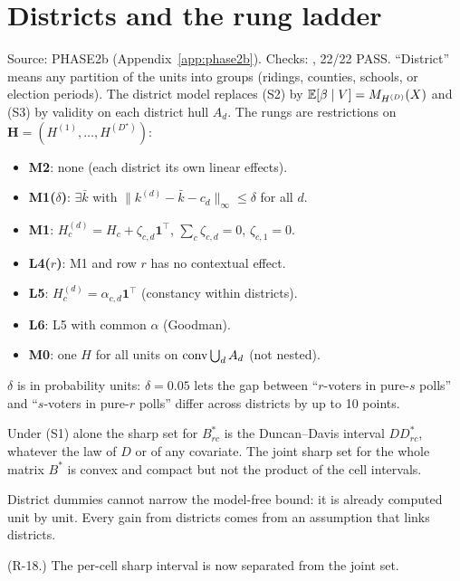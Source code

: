 \section{Districts and the rung ladder}\label{sec:districts}

Source: PHASE2b (Appendix~\ref{app:phase2b}). Checks:
, 22/22 PASS. ``District'' means any partition of the
units into groups (ridings, counties, schools, or election periods). The district
model replaces (S2) by $\mathbb E[\beta\mid V]=M_{H^{(D)}}(X)$ and (S3) by validity on
each district hull $A_d$. The rungs are restrictions on
$\mathbf H=(H^{(1)},\dots,H^{(D^\star)})$:
\begin{itemize}[nosep]
\item \textbf{M2}: none (each district its own linear effects).
\item \textbf{M1($\delta$)}: $\exists\bar k$ with $\|k^{(d)}-\bar k-c_d\|_\infty\le\delta$ for all $d$.
\item \textbf{M1}: $H^{(d)}_c=H_c+\zeta_{c,d}\mathbf 1^\top$, $\sum_c\zeta_{c,d}=0$, $\zeta_{c,1}=0$.
\item \textbf{L4($r$)}: M1 and row $r$ has no contextual effect.
\item \textbf{L5}: $H^{(d)}_c=\alpha_{c,d}\mathbf 1^\top$ (constancy within districts).
\item \textbf{L6}: L5 with common $\alpha$ (Goodman).
\item \textbf{M0}: one $H$ for all units on $\operatorname{conv}\bigcup_dA_d$ (not nested).
\end{itemize}
$\delta$ is in probability units: $\delta=0.05$ lets the gap between ``$r$-voters
in pure-$s$ polls'' and ``$s$-voters in pure-$r$ polls'' differ across districts
by up to 10 points.

\begin{result}\label{res:d0}
 Under (S1) alone the sharp set for $B^*_{rc}$ is the
Duncan--Davis interval $DD^*_{rc}$, whatever the law of $D$ or of any
covariate. The joint sharp set for the whole matrix $B^*$ is convex and compact
but not the product of the cell intervals.
\end{result}
\begin{plain}
District dummies cannot narrow the model-free bound: it is already computed unit
by unit. Every gain from districts comes from an assumption that links districts.
\end{plain}
\begin{revnote}(R-18.) The per-cell sharp interval is now separated from the joint set.\end{revnote}

